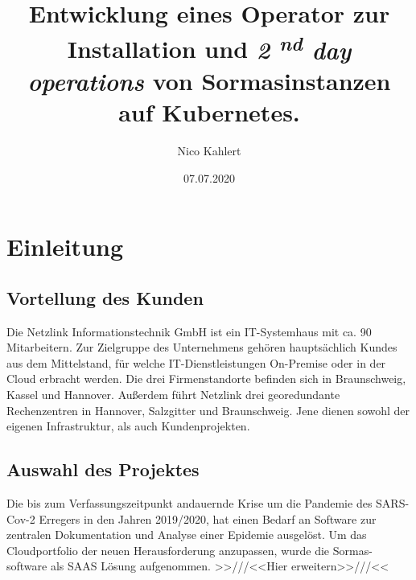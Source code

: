 \documentclass[a4paper,11pt]{article}
\title{
  Entwicklung eines Operator zur Installation und 
  \textit{2
  \textsuperscript{nd} day operations
  } von Sormasinstanzen auf Kubernetes.
}
\date{07.07.2020}
\author{Nico Kahlert}
\begin{document}
  \maketitle
  \newpage
  \tableofcontents
  \newpage
  \vspace{2.5cm}
  \section{Einleitung}
    \subsection{Vortellung des Kunden}
    Die Netzlink Informationstechnik GmbH ist ein IT-Systemhaus mit ca. 90
    Mitarbeitern. Zur Zielgruppe des Unternehmens gehören hauptsächlich 
    Kundes aus dem Mittelstand, für welche IT-Dienstleistungen On-Premise oder in der Cloud
    erbracht werden. Die drei Firmenstandorte befinden sich in Braunschweig, Kassel und Hannover.
    Außerdem führt Netzlink drei georedundante Rechenzentren in Hannover, Salzgitter und Braunschweig.
    Jene dienen sowohl der eigenen Infrastruktur, als auch Kundenprojekten. 
    \subsection{Auswahl des Projektes}
    Die bis zum Verfassungszeitpunkt andauernde Krise um die Pandemie des SARS-Cov-2 Erregers 
    in den Jahren 2019/2020, hat einen Bedarf an Software zur zentralen Dokumentation und Analyse 
    einer Epidemie ausgelöst. Um das Cloudportfolio der neuen Herausforderung anzupassen, wurde die Sormas-
    software als SAAS Lösung aufgenommen. \newline >>///<<Hier erweitern>>///<<
\end{document}
